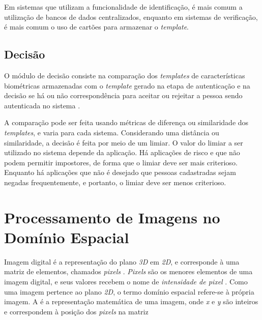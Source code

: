 \par Em sistemas que utilizam a funcionalidade de identificação, é mais comum a utilização de bancos de dados centralizados, enquanto em sistemas de verificação, é mais comum o uso de cartões para armazenar o \textit{template}.

\subsection{Decisão} \label{sec:sis_bio:decisao}

\par O módulo de decisão consiste na comparação dos \textit{templates} de características biométricas armazenadas com o \textit{template} gerado na etapa de autenticação e na decisão se há ou não correspondência para aceitar ou rejeitar a pessoa sendo autenticada no sistema \cite{wayman2005biometric}.

\par A comparação pode ser feita usando métricas de diferença ou similaridade dos \textit{templates}, e varia para cada sistema. Considerando uma distância ou similaridade, a decisão é feita por meio de um limiar. O valor do limiar a ser utilizado no sistema depende da aplicação. Há aplicações de risco e que não podem permitir impostores, de forma que o limiar deve ser mais criterioso. Enquanto há aplicações que não é desejado que pessoas cadastradas sejam negadas frequentemente, e portanto, o limiar deve ser menos criterioso.


\section{Processamento de Imagens no Domínio Espacial}

\par Imagem digital é a representação do plano \textit{3D} em \textit{2D}, e corresponde à uma matriz de elementos, chamados \textit{pixels} \cite{gonsalez2006}. \textit{Pixels} são os menores elementos de uma imagem digital, e seus valores recebem o nome de \textit{intensidade de pixel} \cite{gonsalez2006}. Como uma imagem pertence ao plano \textit{2D}, o termo domínio espacial refere-se à própria imagem. A  é a representação matemática de uma imagem, onde \textit{x} e \textit{y} são inteiros e correspondem à posição dos \textit{pixels} na matriz \cite{gonsalez2006}

